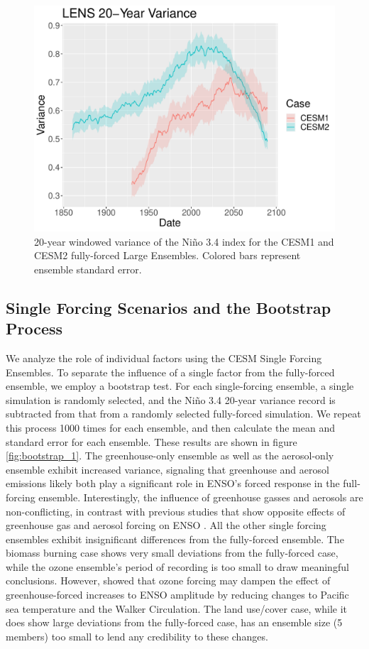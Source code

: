 \documentclass[11pt]{article}
\begin{document}
\begin{figure}
\centering
\includegraphics[width=.8\linewidth]{../../data/figures/ff_compare.pdf}
\caption{\label{fig:variance_2}20-year windowed variance of the Niño 3.4 index for the CESM1 and CESM2 fully-forced Large Ensembles. Colored bars represent ensemble standard error.}
\end{figure}


\subsection{Single Forcing Scenarios and the Bootstrap Process}

We analyze the role of individual factors using the CESM Single Forcing Ensembles. To separate the influence of a single factor from the fully-forced ensemble, we employ a bootstrap test. For each single-forcing ensemble, a single simulation is randomly selected, and the Niño 3.4 20-year variance record is subtracted from that from a randomly selected fully-forced simulation. We repeat this process 1000 times for each ensemble, and then calculate the mean and standard error for each ensemble. These results are shown in figure \ref{fig:bootstrap_1}. The greenhouse-only ensemble as well as the aerosol-only ensemble exhibit increased variance, signaling that greenhouse and aerosol emissions likely both play a significant role in ENSO's forced response in the full-forcing ensemble. Interestingly, the influence of greenhouse gasses and aerosols are non-conflicting, in contrast with previous studies that show opposite effects of greenhouse gas and aerosol forcing on ENSO \citep{stevenson2017forced}. All the other single forcing ensembles exhibit insignificant differences from the fully-forced ensemble. The biomass burning case shows very small deviations from the fully-forced case, while the ozone ensemble's period of recording is too small to draw meaningful conclusions. However, \citet{nowack2017role} showed that ozone forcing may dampen the effect of greenhouse-forced increases to ENSO amplitude by reducing changes to Pacific sea temperature and the Walker Circulation. The land use/cover case, while it does show large deviations from the fully-forced case, has an ensemble size (5 members) too small to lend any credibility to these changes.
\end{document}
